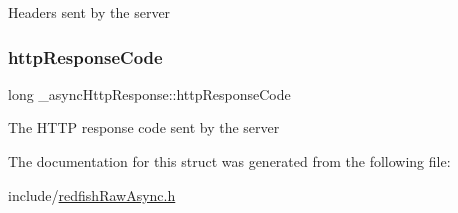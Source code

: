 Headers sent by the server \mbox{\label{struct__asyncHttpResponse_a97fac4e7095590d7cc4e8ccb2dfd753b}} 
\subsubsection{\texorpdfstring{http\+Response\+Code}{httpResponseCode}}
{\footnotesize\ttfamily long \+\_\+async\+Http\+Response\+::http\+Response\+Code}

The H\+T\+TP response code sent by the server 

The documentation for this struct was generated from the following file\+:\begin{DoxyCompactItemize}
\item 
include/\hyperlink{redfishRawAsync_8h}{redfish\+Raw\+Async.\+h}\end{DoxyCompactItemize}
